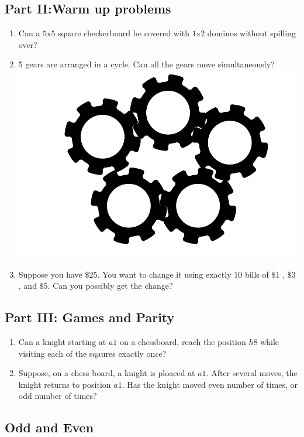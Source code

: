 \documentclass{amsart}
\begin{document}
\subsection{Part II:Warm up problems}
\begin{enumerate}
\item Can a $ 5 \text{x} 5$ square checkerboard be covered with $1 \text{x} 2$ dominos without spilling over?
\item 5 gears are arranged in a cycle. Can all the gears move simultaneously?
\includegraphics[scale=0.3]{gr.jpg}
\item  Suppose you have $\$25$. You want to change it using exactly $10$ bills of $\$1$ , $\$3$ , and  $\$5$. Can you possibly get the change?
\end{enumerate}

\subsection{Part III: Games and Parity}
\begin{enumerate}
\item Can a knight starting at $a1$ on a chessboard, reach the position $h8$ while visiting each of the sqaures exactly once?
\item Suppose, on a chess board, a knight is ploaced at $a1$. After several moves, the knight returns to position $a1$. Has the knight moved even number of times, or odd number of times?
\end{enumerate}

\subsection{Odd and Even}
\end{document}
